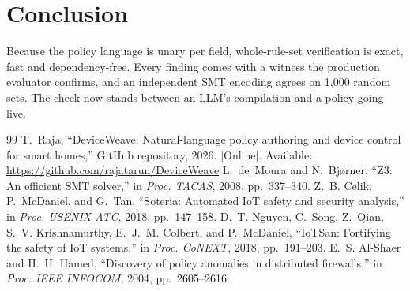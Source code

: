 \documentclass[conference]{IEEEtran}
\theoremstyle{definition}
\begin{document}
\section{Conclusion}
Because the policy language is unary per field, whole-rule-set verification is exact, fast and dependency-free. Every finding comes with a witness the production evaluator confirms, and an independent SMT encoding agrees on 1{,}000 random sets. The check now stands between an LLM's compilation and a policy going live.

\begin{thebibliography}{99}
 T.~Raja, ``DeviceWeave: Natural-language policy authoring and device control for smart homes,'' GitHub repository, 2026. [Online]. Available: \url{https://github.com/rajatarun/DeviceWeave}
 L.~de~Moura and N.~Bj{\o}rner, ``Z3: An efficient SMT solver,'' in \emph{Proc. TACAS}, 2008, pp.~337--340.
 Z.~B. Celik, P.~McDaniel, and G.~Tan, ``Soteria: Automated IoT safety and security analysis,'' in \emph{Proc. USENIX ATC}, 2018, pp.~147--158.
 D.~T. Nguyen, C.~Song, Z.~Qian, S.~V. Krishnamurthy, E.~J.~M. Colbert, and P.~McDaniel, ``IoTSan: Fortifying the safety of IoT systems,'' in \emph{Proc. CoNEXT}, 2018, pp.~191--203.
 E.~S. Al-Shaer and H.~H. Hamed, ``Discovery of policy anomalies in distributed firewalls,'' in \emph{Proc. IEEE INFOCOM}, 2004, pp.~2605--2616.
\end{thebibliography}
\end{document}
